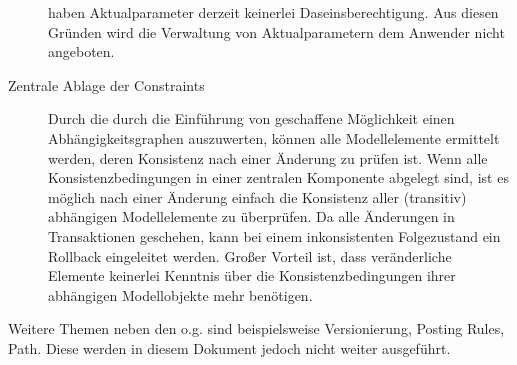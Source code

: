 \begin{description}
  haben Aktualparameter derzeit keinerlei Daseinsberechtigung. Aus diesen Gründen wird die Verwaltung von Aktualparametern dem Anwender nicht angeboten.
  \item[Zentrale Ablage der Constraints] Durch die durch die Einführung von  geschaffene Möglichkeit einen Abhängigkeitsgraphen 
		auszuwerten, können alle Modellelemente ermittelt werden, deren Konsistenz nach einer Änderung zu prüfen ist. Wenn alle Konsistenzbedingungen 
		in einer zentralen Komponente abgelegt sind, ist es möglich nach einer Änderung einfach die Konsistenz aller (transitiv) abhängigen Modellelemente zu überprüfen. 
		Da alle Änderungen in Transaktionen geschehen, kann bei einem inkonsistenten Folgezustand ein Rollback eingeleitet werden.
		Großer Vorteil ist, dass veränderliche Elemente keinerlei Kenntnis über die Konsistenzbedingungen ihrer abhängigen Modellobjekte mehr benötigen.
\end{description}

Weitere Themen neben den o.g. sind beispielsweise Versionierung, Posting Rules, Path. Diese werden in diesem Dokument jedoch nicht weiter ausgeführt.